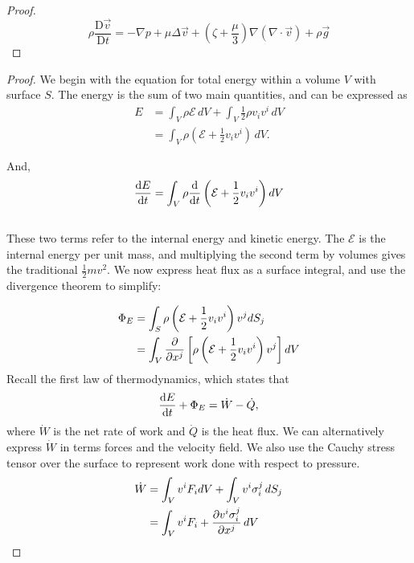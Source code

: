 \documentclass[12 pt]{article}
\theoremstyle{definition}
\newcommand{\Dv}[2]{\frac{\text{D}{#1}}{\text {D}{#2}}}
\begin{document}
\begin{proof}
\begin{equation}
\rho\Dv{\vec{v}}{t} = -\nabla p+\mu\Delta\vec{v} +(\zeta +\frac{\mu}{3})\nabla(\nabla \cdot \vec{v})  + \rho\vec{g}
\end{equation}
\end{proof}


\begin{proof}
We begin with the equation for total energy within a volume $V$ with surface $S$. The energy is the sum of two main quantities, and can be expressed as 
\begin{align*}
E &= \int_V \rho\mathcal{E} \, dV + \int_V \frac{1}{2}\rho v_iv^i \,dV \\
&= \int_V \rho\left(\mathcal{E}+\frac{1}{2}v_iv^i\right) \, dV.
\end{align*}

And, 
\begin{equation}\label{eq:dEdt}
\dv{E}{t} = \int_V \rho\dv{}{t}\left(\mathcal{E}+\frac{1}{2} v_iv^i\right)dV
\end{equation}
\\
\noindent
These two terms refer to the internal energy and kinetic energy. The $\mathcal{E}$ is the internal energy per unit mass, and multiplying the second term by volumes gives the traditional $\frac{1}{2}mv^2$. We now express heat flux as a surface integral, and use the divergence theorem to simplify:

\begin{align}
    \Phi_E &= \int_S \rho\left(\mathcal{E}+\frac{1}{2}v_iv^i\right)v^j dS_j \nonumber\\
    &= \int_V \pdv{}{x^j}\left[\rho\left(\mathcal{E}+\frac{1}{2}v_iv^i\right)v^j\right] dV \label{eq:phi_e}
\end{align}
\noindent
Recall the first law of thermodynamics, which states that \begin{equation}\label{eq:firstthermodynamics}
\dv{E}{t} + \Phi_E = \dot{W} -\dot{Q},
\end{equation}
where $\dot{W}$ is the net rate of work and $\dot{Q}$ is the heat flux. We can alternatively express $\dot{W}$ in terms forces and the velocity field. We also use the Cauchy stress tensor over the surface to represent work done with respect to pressure.
\begin{align}
    \dot{W} &= \int_V v^iF_i dV + \int_V v^i\sigma_i^j \,dS_j \nonumber\\
    &= \int_V v^iF_i + \pdv{v^i\sigma^j_i}{x^j}\,dV \label{eq:W}
\end{align}


\end{proof}
\end{document}
